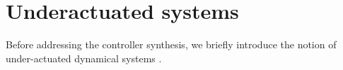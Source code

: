 


\section{Underactuated systems}
Before addressing the controller synthesis, we briefly introduce the notion of under-actuated dynamical systems \cite{Santina2019,Spong1996,Spong1998,Tedrake2009}. 

